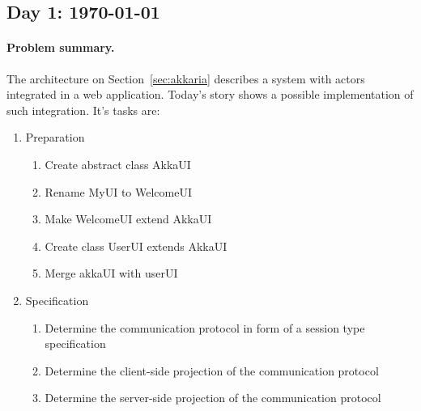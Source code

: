 
\subsection{Day 1:  \today}
\label{sec:day-1}


\paragraph{Problem summary.}
The architecture on Section~\ref{sec:akkaria} describes a system with
\akka actors integrated in a \vaadin web application.
%
Today's story shows a possible implementation of such
integration. It's tasks are:

\begin{enumerate}
\item Preparation
  \begin{enumerate}
  \item Create abstract class AkkaUI\\
  \item Rename MyUI to WelcomeUI\\
  \item Make WelcomeUI extend AkkaUI\\
  \item Create class UserUI extends AkkaUI\\
  \item Merge akkaUI with userUI\\
  \end{enumerate}
\item Specification
  \begin{enumerate}
  \item Determine the communication protocol in form of a session type
    specification\\
  \item Determine the client-side projection of the communication
    protocol\\
  \item Determine the server-side projection of the communication
    protocol\\
  \end{enumerate}

\end{enumerate}
